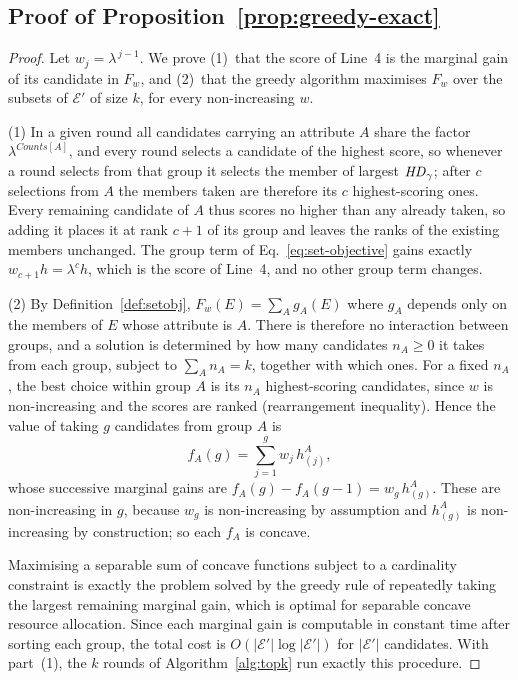 \subsection{Proof of Proposition~\ref{prop:greedy-exact}}
\label{app:greedy}

\begin{proof}
Let $w_j=\lambda^{\,j-1}$. We prove (1)~that the score of Line~4 is the marginal gain of its candidate in $F_w$, and (2)~that the greedy algorithm maximises $F_w$ over the subsets of $\mathcal{E}'$ of size $k$, for every non-increasing $w$.

(1) In a given round all candidates carrying an attribute $A$ share the factor $\lambda^{Counts[A]}$, and every round selects a candidate of the highest score, so whenever a round selects from that group it selects the member of largest $\mathit{HD}_\gamma$; after $c$ selections from $A$ the members taken are therefore its $c$ highest-scoring ones.
Every remaining candidate of $A$ thus scores no higher than any already taken, so adding it places it at rank $c+1$ of its group and leaves the ranks of the existing members unchanged.
The group term of Eq.~\eqref{eq:set-objective} gains exactly $w_{c+1}h=\lambda^{c}h$, which is the score of Line~4, and no other group term changes.

(2) By Definition~\ref{def:setobj}, $F_w(E)=\sum_A g_A(E)$ where $g_A$ depends only on the members of $E$ whose attribute is $A$.
There is therefore no interaction between groups, and a solution is determined by how many candidates $n_A\ge0$ it takes from each group, subject to $\sum_A n_A=k$, together with which ones.
For a fixed $n_A$, the best choice within group $A$ is its $n_A$ highest-scoring candidates, since $w$ is non-increasing and the scores are ranked (rearrangement inequality).
Hence the value of taking $g$ candidates from group $A$ is
\[
f_A(g)=\sum_{j=1}^{g} w_j\, h^A_{(j)},
\]
whose successive marginal gains are $f_A(g)-f_A(g-1)=w_g\,h^A_{(g)}$.
These are non-increasing in $g$, because $w_g$ is non-increasing by assumption and $h^A_{(g)}$ is non-increasing by construction; so each $f_A$ is concave.

Maximising a separable sum of concave functions subject to a cardinality constraint is exactly the problem solved by the greedy rule of repeatedly taking the largest remaining marginal gain, which is optimal for separable concave resource allocation.
Since each marginal gain is computable in constant time after sorting each group, the total cost is $O(|\mathcal{E}'|\log|\mathcal{E}'|)$ for $|\mathcal{E}'|$ candidates.
With part~(1), the $k$ rounds of Algorithm~\ref{alg:topk} run exactly this procedure.
\end{proof}

